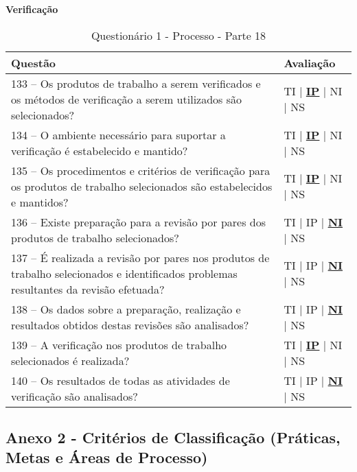 \documentclass[openany,10pt,a4paper]{article}
\begin{document}
\begin{appendix}
	\begin{table}[h]
	\textbf{Verificação }
		\centering
		\caption{Questionário 1 - Processo - Parte 18}
		\begin{tabular}{p{5in}p{1in}}		
			\toprule
			\textbf{Questão}  & \textbf{Avaliação}\\ 
			\midrule
			133 – Os produtos de trabalho a serem verificados e os métodos de verificação a serem 
	utilizados são selecionados?
	 & TI | \underline{\textbf{IP}} | NI | NS \\
			\midrule
			134 – O ambiente necessário para suportar a verificação é estabelecido e mantido?
	 & TI | \underline{\textbf{IP}} | NI | NS \\
			\midrule
			135 – Os procedimentos e critérios de verificação para os produtos de trabalho selecionados são 
	estabelecidos e mantidos?
	 & TI | \underline{\textbf{IP}} | NI | NS \\
			\midrule
			136 – Existe preparação para a revisão por pares dos produtos de trabalho selecionados?
	 & TI | IP | \underline{\textbf{NI}} | NS \\
			\midrule
			137 – É realizada a revisão por pares nos produtos de trabalho selecionados e identificados 
	problemas resultantes da revisão efetuada?
	  & TI | IP | \underline{\textbf{NI}} | NS \\
			\midrule
			138 – Os dados sobre a preparação, realização e resultados obtidos destas revisões são 
	analisados?
	 & TI | IP | \underline{\textbf{NI}} | NS \\
	 \midrule
			139 – A verificação nos produtos de trabalho selecionados é realizada?
	 & TI | \underline{\textbf{IP}} | NI | NS \\
	  \midrule
			140 – Os resultados de todas as atividades de verificação são analisados? 
	 & TI | IP | \underline{\textbf{NI}} | NS \\
			\bottomrule
		\end{tabular} 
	\end{table}
	
\subsection{Anexo 2 - Critérios de Classificação (Práticas, Metas e Áreas de Processo)}


\end{appendix}
\end{document}
